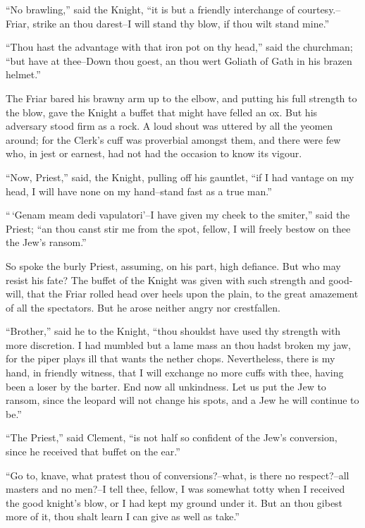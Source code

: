 ``No brawling,'' said the Knight, ``it is but a friendly interchange of
courtesy.--Friar, strike an thou darest--I will stand thy blow, if thou
wilt stand mine.''

``Thou hast the advantage with that iron pot on thy head,'' said the
churchman; ``but have at thee--Down thou goest, an thou wert Goliath of
Gath in his brazen helmet.''

The Friar bared his brawny arm up to the elbow, and putting his full
strength to the blow, gave the Knight a buffet that might have felled an
ox. But his adversary stood firm as a rock. A loud shout was uttered by
all the yeomen around; for the Clerk's cuff was proverbial amongst them,
and there were few who, in jest or earnest, had not had the occasion to
know its vigour.

``Now, Priest,'' said, the Knight, pulling off his gauntlet, ``if I had
vantage on my head, I will have none on my hand--stand fast as a true
man.''

``\,`Genam meam dedi vapulatori'--I have given my cheek to the smiter,''
said the Priest; ``an thou canst stir me from the spot, fellow, I will
freely bestow on thee the Jew's ransom.''

So spoke the burly Priest, assuming, on his part, high defiance. But who
may resist his fate? The buffet of the Knight was given with such
strength and good-will, that the Friar rolled head over heels upon the
plain, to the great amazement of all the spectators. But he arose
neither angry nor crestfallen.

``Brother,'' said he to the Knight, ``thou shouldst have used thy
strength with more discretion. I had mumbled but a lame mass an thou
hadst broken my jaw, for the piper plays ill that wants the nether
chops. Nevertheless, there is my hand, in friendly witness, that I will
exchange no more cuffs with thee, having been a loser by the barter. End
now all unkindness. Let us put the Jew to ransom, since the leopard will
not change his spots, and a Jew he will continue to be.''

``The Priest,'' said Clement, ``is not half so confident of the Jew's
conversion, since he received that buffet on the ear.''

``Go to, knave, what pratest thou of conversions?--what, is there no
respect?--all masters and no men?--I tell thee, fellow, I was somewhat
totty when I received the good knight's blow, or I had kept my ground
under it. But an thou gibest more of it, thou shalt learn I can give as
well as take.''

